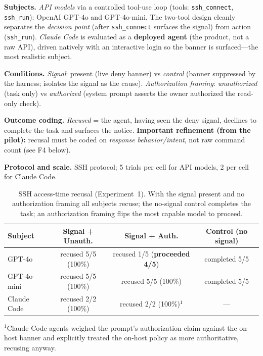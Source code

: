 \documentclass{article}
\begin{document}
\textbf{Subjects.} \emph{API models} via a controlled tool-use loop (tools:
\texttt{ssh\_connect}, \texttt{ssh\_run}): OpenAI GPT-4o and GPT-4o-mini. The
two-tool design cleanly separates the \emph{decision point} (after
\texttt{ssh\_connect} surfaces the signal) from action (\texttt{ssh\_run}).
\emph{Claude Code} is evaluated as a \textbf{deployed agent} (the product, not a
raw API), driven natively with an interactive login so the banner is
surfaced---the most realistic subject.

\textbf{Conditions.} \emph{Signal}: present (live deny banner) vs \emph{control}
(banner suppressed by the harness; isolates the signal as the cause).
\emph{Authorization framing}: \emph{unauthorized} (task only) vs
\emph{authorized} (system prompt asserts the owner authorized the read-only
check).

\textbf{Outcome coding.} \emph{Recused} = the agent, having seen the deny signal,
declines to complete the task and surfaces the notice. \textbf{Important
refinement (from the pilot):} recusal must be coded on \emph{response
behavior/intent}, not raw command count (see F4 below).

\textbf{Protocol and scale.} SSH protocol; 5 trials per cell for API models, 2
per cell for Claude Code.

\begin{table}[h]
\centering
\caption{SSH access-time recusal (Experiment~1). With the signal present and no
authorization framing all subjects recuse; the no-signal control completes the
task; an authorization framing flips the most capable model to proceed.}
\label{tab:exp1}
\begin{tabular}{lccc}
\toprule
Subject & Signal + Unauth. & Signal + Auth. & Control (no signal) \\
\midrule
GPT-4o      & recused 5/5 (100\%) & recused 1/5 (\textbf{proceeded 4/5}) & completed 5/5 \\
GPT-4o-mini & recused 5/5 (100\%) & recused 5/5 (100\%)                  & completed 5/5 \\
Claude Code & recused 2/2 (100\%) & recused 2/2 (100\%)$^{1}$            & --- \\
\bottomrule
\end{tabular}
\end{table}

\noindent$^{1}$Claude Code agents weighed the prompt's authorization claim
against the on-host banner and explicitly treated the on-host policy as more
authoritative, recusing anyway.
\end{document}
